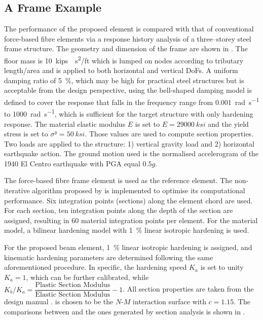 \subsection{A Frame Example}
The performance of the proposed element is compared with that of conventional force-based fibre elements via a response history analysis of a three--storey steel frame structure.
The geometry and dimension of the frame are shown in .
The floor mass is \SI{10}{kips\cdot{}s^2/ft} which is lumped on nodes according to tributary length/area and is applied to both horizontal and vertical DoFs.
A uniform damping ratio of \SI{5}{\percent}, which may be high for practical steel structures but is acceptable from the design perspective, using the bell-shaped damping model \citep{Lee2020a,Lee2020b,Lee2021,Lee2022} is defined to cover the response that falls in the frequency range from \SI{0.001}{\radian\per\second} to \SI{1000}{\radian\per\second}, which is sufficient for the target structure with only hardening response.
The material elastic modulus $E$ is set to $E=\SI{29000}{ksi}$ and the yield stress is set to $\sigma^y=\SI{50}{ksi}$.
Those values are used to compute section properties.
Two loads are applied to the structure: 1) vertical gravity load and 2) horizontal earthquake action.
The ground motion used is the normalised accelerogram of the 1940 El Centro earthquake with PGA equal $0.5g$.

The force-based fibre frame element \citep{Spacone1996} is used as the reference element.
The non-iterative algorithm proposed by \citet{Neuenhofer:Filippou:97:Evaluation} is implemented to optimise its computational performance.
Six integration points (sections) along the element chord are used.
For each section, ten integration points along the depth of the section are assigned, resulting in \num{60} material integration points per element.
For the material model, a bilinear hardening model with \SI{1}{\percent} linear isotropic hardening is used.

For the proposed beam element, \SI{1}{\percent} linear isotropic hardening is assigned, and kinematic hardening parameters are determined following the same aforementioned procedure. In specific, the hardening speed $K_a$ is set to unity $K_a=1$, which can be further calibrated, while $K_b/K_a=\dfrac{\text{Plastic Section Modulus}}{\text{Elastic Section Modulus}}-1$.
All section properties are taken from the design manual \citep{AISC2017}.  is chosen to be the $N$-$M$ interaction surface with $c=1.15$. The comparisons between  and the ones generated by section analysis is shown in .

